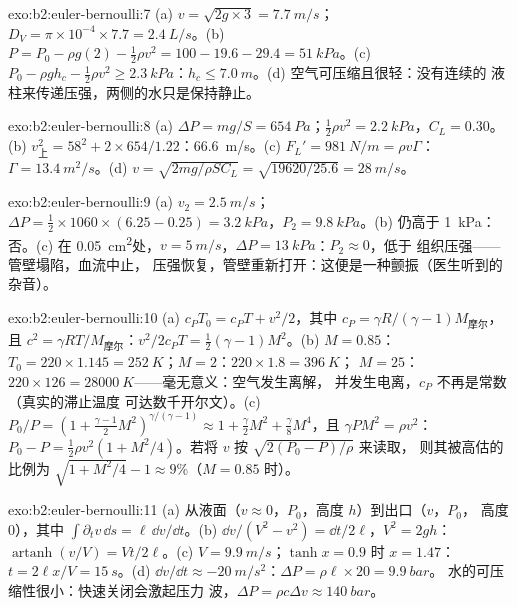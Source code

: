 \begin{solution}{exo:b2:euler-bernoulli:7}
(a) $v = \sqrt{2g \times 3} = \qty{7.7}{m/s}$；$D_V = \pi \times 10^{-4} \times 7.7 =
\qty{2.4}{L/s}$。(b) $P = P_0 - \rho g(2) - \tfrac12\rho v^2 = 100 - 19.6 - 29.4 =
\qty{51}{kPa}$。(c) $P_0 - \rho gh_c - \tfrac12\rho v^2 \ge \qty{2.3}{kPa}$：$h_c \le
\qty{7.0}{m}$。(d) 空气可压缩且很轻：没有连续的
液柱来传递压强，两侧的水只是保持静止。
\end{solution}

\begin{solution}{exo:b2:euler-bernoulli:8}
(a) $\Delta P = mg/S = \qty{654}{Pa}$；$\tfrac12\rho v^2 = \qty{2.2}{kPa}$，$C_L = 0.30$。
(b) $v_{\text{上}}^2 = 58^2 + 2 \times 654/1.22$：\qty{66.6}{m/s}。(c) $F_L' =
\qty{981}{N/m} = \rho v\Gamma$：$\Gamma = \qty{13.4}{m^2/s}$。(d) $v = \sqrt{2mg/
\rho SC_L} = \sqrt{19620/25.6} = \qty{28}{m/s}$。
\end{solution}

\begin{solution}{exo:b2:euler-bernoulli:9}
(a) $v_2 = \qty{2.5}{m/s}$；$\Delta P = \tfrac12 \times 1060 \times (6.25 - 0.25) =
\qty{3.2}{kPa}$，$P_2 = \qty{9.8}{kPa}$。(b) 仍高于 \qty{1}{kPa}：否。(c) 在 
\qty{0.05}{cm^2}处，$v = \qty{5}{m/s}$，$\Delta P = \qty{13}{kPa}$：$P_2 \approx 0$，低于
组织压强——管壁塌陷，血流中止，
压强恢复，管壁重新打开：这便是一种颤振（医生听到的杂音）。
\end{solution}

\begin{solution}{exo:b2:euler-bernoulli:10}
(a) $c_PT_0 = c_PT + v^2/2$，其中 $c_P = \gamma R/(\gamma - 1)M_{\text{摩尔}}$，且
$c^2 = \gamma RT/M_{\text{摩尔}}$：$v^2/2c_PT = \tfrac12(\gamma - 1)M^2$。(b) $M =
0.85$：$T_0 = 220 \times 1.145 = \qty{252}{K}$；$M = 2$：$220 \times 1.8 = \qty{396}{K}$；
$M = 25$：$220 \times 126 = \qty{28000}{K}$——毫无意义：空气发生离解，
并发生电离，$c_P$ 不再是常数（真实的滞止温度
可达数千开尔文）。(c) $P_0/P = (1 + \tfrac{\gamma - 1}2M^2)^{\gamma/(\gamma
- 1)} \approx 1 + \tfrac{\gamma}2M^2 + \tfrac{\gamma}8M^4$，且 $\gamma PM^2 = \rho v^2$：
$P_0 - P = \tfrac12\rho v^2(1 + M^2/4)$。若将 $v$ 按 $\sqrt{2(P_0 - P)/\rho}$ 来读取，
则其被高估的比例为 $\sqrt{1 + M^2/4} - 1 \approx 9\%$（$M = 0.85$ 时）。
\end{solution}

\begin{solution}{exo:b2:euler-bernoulli:11}
(a) 从液面（$v \approx 0$，$P_0$，高度 $h$）到出口（$v$，$P_0$，
高度 $0$），其中 $\int\partial_tv\,\dd s = \ell\,\dd v/\dd t$。(b) $\dd v/(V^2 -
v^2) = \dd t/2\ell$，$V^2 = 2gh$：$\operatorname{artanh}(v/V) = Vt/2\ell$。(c) $V =
\qty{9.9}{m/s}$；$\tanh x = 0.9$ 时 $x = 1.47$：$t = 2\ell x/V = \qty{15}{s}$。(d)
$\dd v/\dd t \approx \qty{-20}{m/s^2}$：$\Delta P = \rho\ell \times 20 = \qty{9.9}{bar}$。
水的可压缩性很小：快速关闭会激起压力
波，$\Delta P = \rho c\Delta v \approx \qty{140}{bar}$。
\end{solution}

